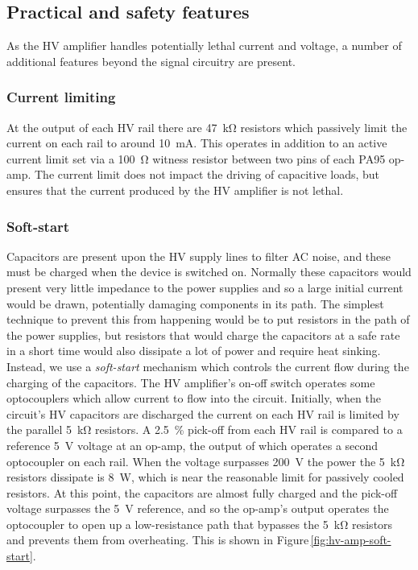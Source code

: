 \subsection{Practical and safety features}
As the \gls{HV} amplifier handles potentially lethal current and voltage, a number of additional features beyond the signal circuitry are present.

\subsubsection{Current limiting}
At the output of each \gls{HV} rail there are \SI{47}{\kilo\ohm} resistors which passively limit the current on each rail to around \SI{10}{\milli\ampere}. This operates in addition to an active current limit set via a \SI{100}{\ohm} witness resistor between two pins of each PA95 op-amp. The current limit does not impact the driving of capacitive loads, but ensures that the current produced by the \gls{HV} amplifier is not lethal.

\subsubsection{Soft-start}
Capacitors are present upon the \gls{HV} supply lines to filter \gls{AC} noise, and these must be charged when the device is switched on. Normally these capacitors would present very little impedance to the power supplies and so a large initial current would be drawn, potentially damaging components in its path. The simplest technique to prevent this from happening would be to put resistors in the path of the power supplies, but resistors that would charge the capacitors at a safe rate in a short time would also dissipate a lot of power and require heat sinking. Instead, we use a \emph{soft-start} mechanism which controls the current flow during the charging of the capacitors. The \gls{HV} amplifier's on-off switch operates some optocouplers which allow current to flow into the circuit. Initially, when the circuit's \gls{HV} capacitors are discharged the current on each \gls{HV} rail is limited by the parallel \SI{5}{\kilo\ohm} resistors. A \SI{2.5}{\percent} pick-off from each \gls{HV} rail is compared to a reference \SI{5}{\volt} voltage at an op-amp, the output of which operates a second optocoupler on each rail. When the voltage surpasses \SI{200}{\volt} the power the \SI{5}{\kilo\ohm} resistors dissipate is \SI{8}{\watt}, which is near the reasonable limit for passively cooled resistors. At this point, the capacitors are almost fully charged and the pick-off voltage surpasses the \SI{5}{\volt} reference, and so the op-amp's output operates the optocoupler to open up a low-resistance path that bypasses the \SI{5}{\kilo\ohm} resistors and prevents them from overheating. This is shown in Figure\,\ref{fig:hv-amp-soft-start}.

